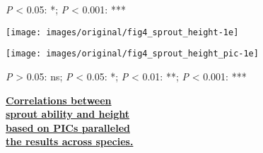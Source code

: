 \documentclass[a0, 25, plainboxedsections]{sciposter} %
\begin{document}
\begin{multicols}{2}
\begin{mdframed}[style=subsection.frame,frametitle=\textbf{\LARGE{More highly sprouters are more avoid self-shading}}]
\begin{figure}
\begin{minipage}{0.75\hsize}
   \flushleft\vspace{-1em}\hspace*{0.6em}
    {\tiny \textit{P} < 0.05: *; \textit{P} < 0.001: ***}
 \end{minipage}
\end{figure}

\end{mdframed}

\columnbreak
\begin{mdframed}[style=subsection.frame,frametitle=\textbf{\LARGE{Sprout avility increases with decreasing height}}] %
\vspace{-1.0em}
\begin{figure}
	\centering
		\texttt{[image: images/original/fig4\_sprout\_height-1e]}
	
	\flushleft
\end{figure}

\vspace{-1.5em}
\begin{figure}
 \begin{minipage}{0.55\hsize}
  \centering
   \texttt{[image: images/original/fig4\_sprout\_height\_pic-1e]}
   
   {\tiny \textit{P} > 0.05: ns; \textit{P} < 0.05: *; \textit{P} < 0.01: **; \textit{P} < 0.001: ***}
 \end{minipage}
 \begin{minipage}{0.45\hsize}
 
 
{\large \faHandLeft \textbf{\underline{Correlations between}}\\ \textbf{\underline{sprout ability and height}}\\\textbf{\underline{based on PICs paralleled}}\\\textbf{\underline{the results across species.}}}
 \end{minipage}
\end{figure}

\end{mdframed}

\end{multicols}

\end{document}
